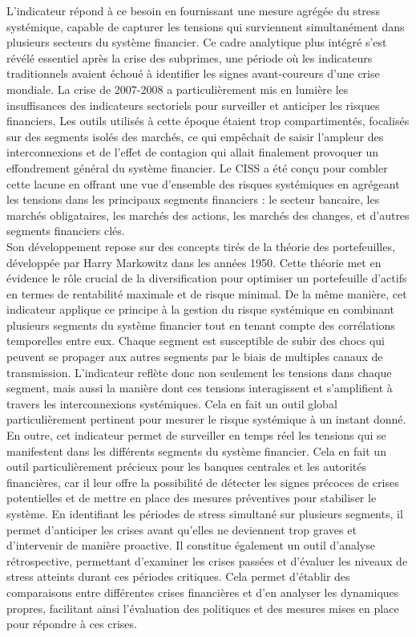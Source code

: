 \begin{sloppypar}
L'indicateur répond à ce besoin en fournissant une mesure agrégée du stress systémique, capable de capturer les tensions qui surviennent simultanément dans plusieurs secteurs du système financier. Ce cadre analytique plus intégré s’est révélé essentiel après la crise des subprimes, une période où les indicateurs traditionnels avaient échoué à identifier les signes avant-coureurs d’une crise mondiale. La crise de 2007-2008 a particulièrement mis en lumière les insuffisances des indicateurs sectoriels pour surveiller et anticiper les risques financiers. Les outils utilisés à cette époque étaient trop compartimentés, focalisés sur des segments isolés des marchés, ce qui empêchait de saisir l'ampleur des interconnexions et de l’effet de contagion qui allait finalement provoquer un effondrement général du système financier. Le CISS a été conçu pour combler cette lacune en offrant une vue d’ensemble des risques systémiques en agrégeant les tensions dans les principaux segments financiers : le secteur bancaire, les marchés obligataires, les marchés des actions, les marchés des changes, et d’autres segments financiers clés.\\

Son développement repose sur des concepts tirés de la théorie des portefeuilles, développée par Harry Markowitz dans les années 1950. Cette théorie met en évidence le rôle crucial de la diversification pour optimiser un portefeuille d’actifs en termes de rentabilité maximale et de risque minimal. De la même manière, cet indicateur applique ce principe à la gestion du risque systémique en combinant plusieurs segments du système financier tout en tenant compte des corrélations temporelles entre eux. Chaque segment est susceptible de subir des chocs qui peuvent se propager aux autres segments par le biais de multiples canaux de transmission. L’indicateur reflète donc non seulement les tensions dans chaque segment, mais aussi la manière dont ces tensions interagissent et s’amplifient à travers les interconnexions systémiques. Cela en fait un outil global particulièrement pertinent pour mesurer le risque systémique à un instant donné.\\

En outre, cet indicateur permet de surveiller en temps réel les tensions qui se manifestent dans les différents segments du système financier. Cela en fait un outil particulièrement précieux pour les banques centrales et les autorités financières, car il leur offre la possibilité de détecter les signes précoces de crises potentielles et de mettre en place des mesures préventives pour stabiliser le système. En identifiant les périodes de stress simultané sur plusieurs segments, il permet d’anticiper les crises avant qu’elles ne deviennent trop graves et d’intervenir de manière proactive. Il constitue également un outil d’analyse rétrospective, permettant d’examiner les crises passées et d’évaluer les niveaux de stress atteints durant ces périodes critiques. Cela permet d’établir des comparaisons entre différentes crises financières et d’en analyser les dynamiques propres, facilitant ainsi l’évaluation des politiques et des mesures mises en place pour répondre à ces crises.\\


\end{sloppypar}
